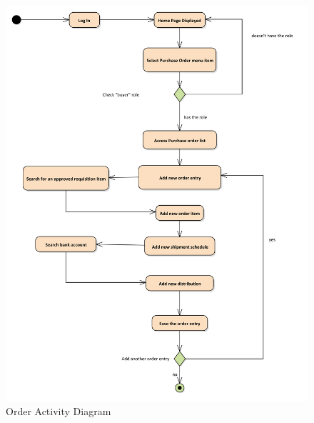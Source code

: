 \documentclass[12pt]{report} %
\begin{document}
\begin{figure}[h]
	\includegraphics[width=1\textwidth]{pic/Activity/order.png}
	\caption{Order Activity Diagram}
	\label{fig:order}
\end{figure}
\end{document}
